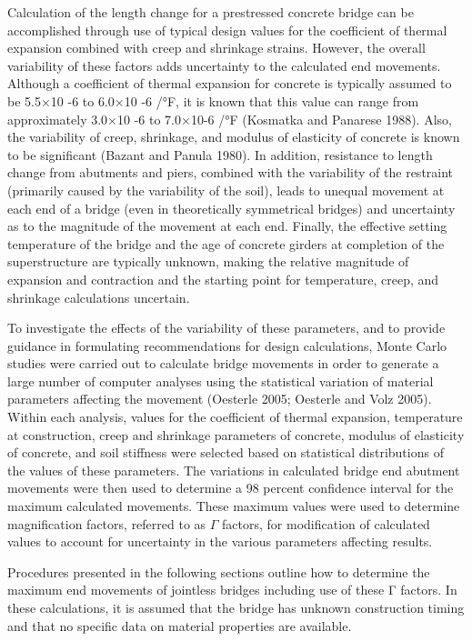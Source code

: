 Calculation of the length change for a prestressed concrete bridge can be accomplished through use of typical
design values for the coefficient of thermal expansion combined with creep and shrinkage strains. However, the
overall variability of these factors adds uncertainty to the calculated end movements. Although a coefficient of
thermal expansion for concrete is typically assumed to be 5.5×10 -6 to 6.0×10 -6 /°F, it is known that this value can
range from approximately 3.0×10 -6 to 7.0×10-6 /°F (Kosmatka and Panarese 1988). Also, the variability of creep,
shrinkage, and modulus of elasticity of concrete is known to be significant (Bazant and Panula 1980). In addition,
resistance to length change from abutments and piers, combined with the variability of the restraint (primarily caused
by the variability of the soil), leads to unequal movement at each end of a bridge (even in theoretically symmetrical
bridges) and uncertainty as to the magnitude of the movement at each end. Finally, the effective setting temperature
of the bridge and the age of concrete girders at completion of the superstructure are typically unknown, making the relative magnitude of expansion and contraction and the starting point for temperature, creep, and shrinkage
calculations uncertain.

To investigate the effects of the variability of these parameters, and to provide guidance in formulating
recommendations for design calculations, Monte Carlo studies were carried out to calculate bridge movements in
order to generate a large number of computer analyses using the statistical variation of material parameters affecting
the movement (Oesterle 2005; Oesterle and Volz 2005). Within each analysis, values for the coefficient of thermal
expansion, temperature at construction, creep and shrinkage parameters of concrete, modulus of elasticity of concrete,
and soil stiffness were selected based on statistical distributions of the values of these parameters. The variations in
calculated bridge end abutment movements were then used to determine a 98 percent confidence interval for the
maximum calculated movements. These maximum values were used to determine magnification factors, referred to
as $\Gamma$ factors, for modification of calculated values to account for uncertainty in the various parameters affecting
results.

Procedures presented in the following sections outline how to determine the maximum end movements of
jointless bridges including use of these Γ factors. In these calculations, it is assumed that the bridge has unknown
construction timing and that no specific data on material properties are available.

